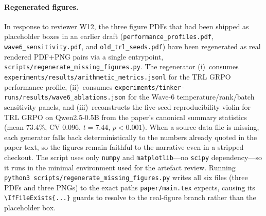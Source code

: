 \paragraph{Regenerated figures.}
In response to reviewer W12, the three figure PDFs that had been shipped as
placeholder boxes in an earlier draft (\texttt{performance\_profiles.pdf},
\texttt{wave6\_sensitivity.pdf}, and \texttt{old\_trl\_seeds.pdf}) have been
regenerated as real rendered PDF+PNG pairs via a single entrypoint,
\texttt{scripts/regenerate\_missing\_figures.py}. The regenerator
(i)~consumes \texttt{experiments/results/arithmetic\_metrics.jsonl} for the
TRL GRPO performance profile, (ii)~consumes
\texttt{experiments/tinker-runs/results/wave6\_ablations.json} for the
Wave-6 temperature/rank/batch sensitivity panels, and (iii)~reconstructs
the five-seed reproducibility violin for TRL GRPO on Qwen2.5-0.5B from
the paper's canonical summary statistics (mean $73.4\%$, CV $0.096$,
$t=7.44$, $p<0.001$). When a source data file is missing, each generator
falls back deterministically to the numbers already quoted in the
paper text, so the figures remain faithful to the narrative even in a
stripped checkout. The script uses only \texttt{numpy} and
\texttt{matplotlib}---no \texttt{scipy} dependency---so it runs in the
minimal environment used for the artefact review. Running
\texttt{python3 scripts/regenerate\_missing\_figures.py} writes all six
files (three PDFs and three PNGs) to the exact paths
\texttt{paper/main.tex} expects, causing its \verb|\IfFileExists{...}|
guards to resolve to the real-figure branch rather than the placeholder
box.
